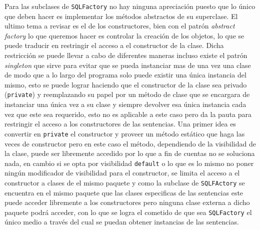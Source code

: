 Para las subclases de \verb=SQLFactory= no hay ninguna apreciación puesto que lo único que deben hacer es implementar los métodos abstractos de su superclase. El ultimo tema a revisar es el de los constructores, bien con el patrón \textit{abstract factory} lo que queremos hacer es controlar la creación de los objetos, lo que se puede traducir en restringir el acceso a el constructor de la clase. Dicha restricción se puede llevar a cabo de diferentes maneras incluso existe el patrón \textit{singleton} que sirve para evitar que se pueda instanciar mas de una vez una clase de modo que a lo largo del programa solo puede existir una única instancia del mismo\cite{Metsker:2002:DPJ}, esto se puede lograr haciendo que el constructor de la clase sea privado (\verb=private=) y reemplazando su papel por un método de clase que se encargara de instanciar una única vez a su clase y siempre devolver esa única instancia cada vez que este sea requerido, esto no es aplicable a este caso pero da la pauta para restringir el acceso a los constructores de las sentencias. Una primer idea es convertir en \verb=private= el constructor y proveer un método estático que haga las veces de constructor  pero en este caso el método, dependiendo de la visibilidad de la clase, puede ser libremente accedido por lo que a fin de cuentas no se soluciona nada, en cambio si se opta por visibilidad \verb=default= o lo que es lo mismo no poner ningún modificador de visibilidad para el constructor, se limita el acceso a el constructor a clases de el mismo paquete y como la subclase de \verb=SQLFActory= se encuentra en el mismo paquete que las clases especificas de las sentencias este puede acceder libremente a los constructores pero ninguna clase externa a dicho paquete podrá acceder, con lo que se logra el cometido de que sea \verb=SQLFactory= el único medio a través del cual se puedan obtener instancias de las sentencias.   
%
